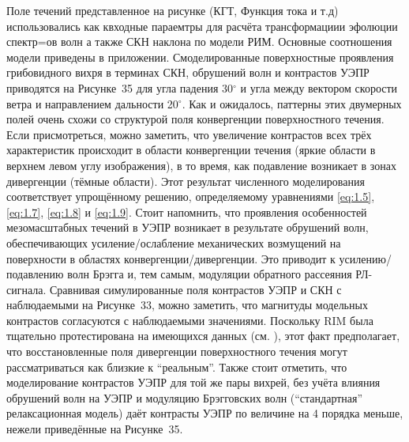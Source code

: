 Поле течений представленное на рисунке (КГТ, Функция тока и т.д) использовались как квходные параемтры для расчёта трансформациии эфолюции спектр=ов волн а также СКН наклона по модели РИМ. Основные соотношения модели приведены в приложении. Смоделированные поверхностные проявления грибовидного вихря в терминах СКН, обрушений волн и контрастов УЭПР приводятся на Рисунке~35 для угла падения 30${}^\circ$ и угла между вектором скорости ветра и направлением дальности 20${}^\circ$. Как и ожидалось, паттерны этих двумерных полей очень схожи со структурой поля конвергенции поверхностного течения. Если присмотреться, можно заметить, что увеличение контрастов всех трёх характеристик происходит в области конвергенции течения (яркие области в верхнем левом углу изображения), в то время, как подавление возникает в зонах дивергенции (тёмные области). Этот результат численного моделирования соответствует упрощённому решению, определяемому уравнениями \eqref{eq:1.5}, \eqref{eq:1.7}, \eqref{eq:1.8} и \eqref{eq:1.9}. Стоит напомнить, что проявления особенностей мезомасштабных течений в УЭПР возникает в результате обрушений волн, обеспечивающих усиление/ослабление механических возмущений на поверхности в областях конвергенции/дивергенции. Это приводит к усилению/подавлению волн Брэгга и, тем самым, модуляции обратного рассеяния РЛ-сигнала. Сравнивая симулированные поля контрастов УЭПР и СКН с наблюдаемыми на Рисунке~33, можно заметить, что магнитуды модельных контрастов согласуются с наблюдаемыми значениями. Поскольку RIM была тщательно протестирована на имеющихся данных (см. \citep{Kudryavtsev2005}), этот факт предполагает, что восстановленные поля дивергенции поверхностного течения могут рассматриваться как близкие к ``реальным''. Также стоит отметить, что моделирование контрастов УЭПР для той же пары вихрей, без учёта влияния обрушений волн на УЭПР и модуляцию Брэгговских волн (``стандартная'' релаксационная модель) даёт контрасты УЭПР по величине на 4 порядка меньше, нежели приведённые на Рисунке~35.



